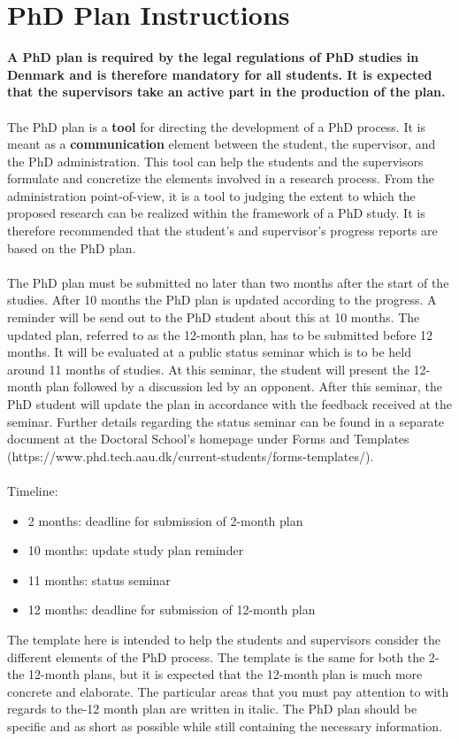 \section*{PhD Plan Instructions}
\textbf{A PhD plan is required by the legal regulations of PhD studies in Denmark and is therefore mandatory for all students. It is expected that the supervisors take an active part in the production of the plan.}
\\
\\
The PhD plan is a \textbf{tool} for directing the development of a PhD process. It is meant as a \textbf{communication} element between the student, the supervisor, and the PhD administration. This tool can help the students and the supervisors formulate and concretize the elements involved in a research process. From the administration point-of-view, it is a tool to judging the extent to which the proposed research can be realized within the framework of a PhD study. It is therefore recommended that the student’s and supervisor’s progress reports are based on the PhD plan.
\\
\\
The PhD plan must be submitted no later than two months after the start of the studies. After 10 months the PhD plan is updated according to the progress. A reminder will be send out to the PhD student about this at 10 months. The updated plan, referred to as the 12-month plan, has to be submitted before 12 months. It will be evaluated at a public status seminar which is to be held around 11 months of studies. At this seminar, the student will present the 12-month plan followed by a discussion led by an opponent. After this seminar, the PhD student will update the plan in accordance with the feedback received at the seminar. Further details regarding the status seminar can be found in a separate document at the Doctoral School’s homepage under Forms and Templates (https://www.phd.tech.aau.dk/current-students/forms-templates/).   \\
\\
Timeline:
\begin{itemize}
    \item 2 months: deadline for submission of 2-month plan
    \item 10 months: update study plan reminder
    \item 11 months: status seminar
    \item 12 months: deadline for submission of 12-month plan 
\end{itemize}
The template here is intended to help the students and supervisors consider the different elements of the PhD process. The template is the same for both the 2- the 12-month plans, but it is expected that the 12-month plan is much more concrete and elaborate. The particular areas that you must pay attention to with regards to the-12 month plan are written in italic. The PhD plan should be specific and as short as possible while still containing the necessary information.
